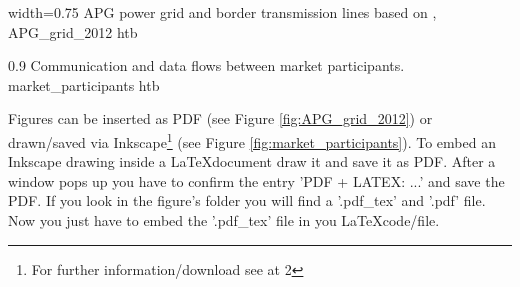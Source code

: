 \documentclass{eegreport}
\begin{document}
       {width=0.75\textwidth}%
       {APG power grid and border transmission lines based on , \cite{APG.11.2013}}%
       {}%
       {APG_grid_2012}%
       {htb}%
       
       {0.9}%
       {Communication and data flows between market participants.}%
       {}%
       {market_participants}%
       {htb}%



Figures can be inserted as PDF (see Figure \ref{fig:APG_grid_2012}) or drawn/saved via Inkscape\footnote{For further information/download see at  \cite{Inkscape.2015}2} (see Figure \ref{fig:market_participants}). To embed an Inkscape drawing inside a \LaTeX document draw it and save it as PDF. After a window pops up you have to confirm the entry 'PDF + LATEX: ...' and save the PDF. If you look in the figure's folder you will find a '.pdf\_tex' and '.pdf' file. Now you just have to embed the '.pdf\_tex' file in you \LaTeX code/file. 
\end{document}
